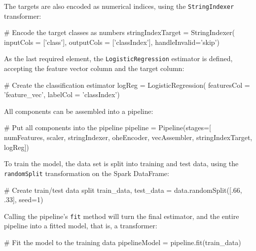 The targets are also encoded as numerical indices, using the \texttt{StringIndexer} transformer:

\begin{samepage}
\begin{pythoncode}
# Encode the target classes as numbers
stringIndexTarget = StringIndexer(
    inputCols = ['class'],
    outputCols = ['classIndex'],
    handleInvalid='skip')
\end{pythoncode}    
\end{samepage}

As the last required element, the \texttt{LogisticRegression} estimator is defined, accepting the feature vector column and the target column:

\begin{samepage}
\begin{pythoncode}
# Create the classification estimator
logReg = LogisticRegression(
    featuresCol = 'feature_vec', labelCol = 'classIndex')
\end{pythoncode}
\end{samepage}
All components can be assembled into a pipeline:

\begin{samepage}
\begin{pythoncode}
# Put all components into the pipeline
pipeline = Pipeline(stages=[
    numFeatures,
    scaler,
    stringIndexer,
    oheEncoder,
    vecAssembler,
    stringIndexTarget,
    logReg])
\end{pythoncode}
\end{samepage}

To train the model, the data set is split into training and test data, using the \texttt{randomSplit} transformation on the Spark DataFrame:

\begin{samepage}
\begin{pythoncode}
# Create train/test data split
train_data, test_data = data.randomSplit([.66, .33], seed=1)
\end{pythoncode}
\end{samepage}

Calling the pipeline's \texttt{fit} method will turn the final estimator, and the entire pipeline into a fitted model, that is, a transformer:

\begin{samepage}
\begin{pythoncode}
# Fit the model to the training data
pipelineModel = pipeline.fit(train_data)
\end{pythoncode}
\end{samepage}

